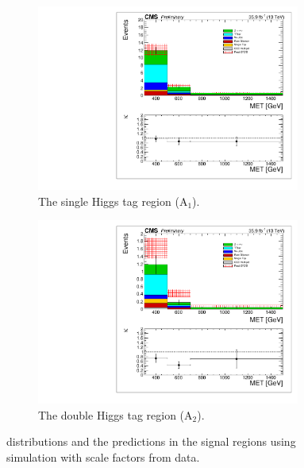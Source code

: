 \begin{figure}[hb!]
\centering
\begin{subfigure}[b]{0.425\textwidth}
\centering
\includegraphics[trim={5px 5px 5px 5px},clip,width=0.95\textwidth]{figs/MCclosureSF_singleHiggsRegionTotal.pdf}
\caption{The single Higgs tag region (A$_{1}$).}
\end{subfigure}
\begin{subfigure}[b]{0.425\textwidth}
\centering
\includegraphics[trim={5px 5px 5px 5px},clip,width=0.95\textwidth]{figs/MCclosureSF_doubleHiggsRegionTotal.pdf} 
\caption{The double Higgs tag region (A$_{2}$).}
\end{subfigure}
\caption{\ptmiss distributions and the predictions in the signal regions using simulation with scale factors from data.}
\label{fig:mcclosuresf}
\end{figure}

